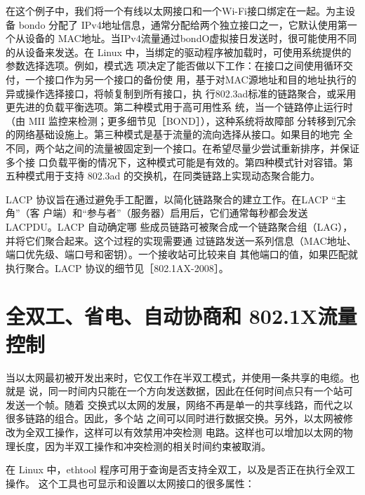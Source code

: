 在这个例子中，我们将一个有线以太网接口和一个Wi-Fi接口绑定在一起。为主设备
bondo 分配了 IPv4地址信息，通常分配给两个独立接口之一，它默认使用第一个从设备的
MAC地址。当IPv4流量通过bondO虚拟接日发送时，很可能使用不同的从设备来发送。在
Linux 中，当绑定的驱动程序被加载时，可使用系统提供的参数选择选项。例如，模式选
项决定了能否做以下工作：在接口之间使用循环交付，一个接口作为另一个接口的备份使
用，基于对MAC源地址和目的地址执行的异或操作选择接口，将帧复制到所有接口，执
行802.3ad标准的链路聚合，或采用更先进的负载平衡选项。第二种模式用于高可用性系
统，当一个链路停止运行时（由 MII 监控来检测；更多细节见［BOND］），这种系统将故障部
分转移到冗余的网络基础设施上。第三种模式是基于流量的流向选择从接口。如果目的地完
全不同，两个站之间的流量被固定到一个接口。在希望尽量少尝试重新排序，并保证多个接
口负载平衡的情况下，这种模式可能是有效的。第四种模式针对容错。第五种模式用于支持
802.3ad 的交换机，在同类链路上实现动态聚合能力。

LACP 协议旨在通过避免手工配置，以简化链路聚合的建立工作。在LACP “主角”（客
户端）和“参与者”（服务器）启用后，它们通常每秒都会发送LACPDU。LACP 自动确定哪
些成员链路可被聚合成一个链路聚合组（LAG），并将它们聚合起来。这个过程的实现需要通
过链路发送一系列信息（MAC地址、端口优先级、端口号和密钥）。一个接收站可比较来自
其他端口的值，如果匹配就执行聚合。LACP 协议的细节见［802.1AX-2008］。

\section{全双工、省电、自动协商和 802.1X流量控制}

当以太网最初被开发出来时，它仅工作在半双工模式，并使用一条共享的电缆。也就是
说，同一时间内只能在一个方向发送数据，因此在任何时间点只有一个站可发送一个帧。随着
交换式以太网的发展，网络不再是单一的共享线路，而代之以很多链路的组合。因此，多个站
之间可以同时进行数据交换。另外，以太网被修改为全双工操作，这样可以有效禁用冲突检测
电路。这样也可以增加以太网的物理长度，因为半双工操作和冲突检测的相关时间约束被取消。

在 Linux 中，ethtool 程序可用于查询是否支持全双工，以及是否正在执行全双工操作。
这个工具也可显示和设置以太网接口的很多属性：

